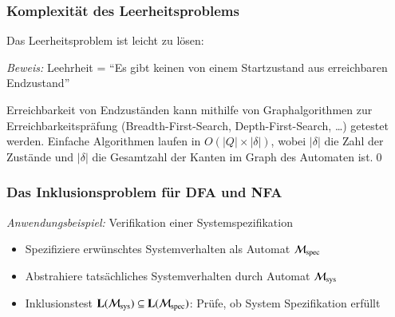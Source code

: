 \documentclass[onlymath]{beamer}
\begin{document}
\begin{frame}\frametitle{Komplexität des Leerheitsproblems}

Das Leerheitsproblem ist leicht zu lösen:


\pause
\emph{Beweis:} Leehrheit = "`Es gibt keinen von einem Startzustand aus erreichbaren Endzustand"'
\bigskip

Erreichbarkeit von Endzuständen kann mithilfe von Graphalgorithmen zur Erreichbarkeitspräfung (Breadth-First-Search, Depth-First-Search, \ldots) getestet werden. Einfache Algorithmen laufen in $O(|Q|\times |\delta|)$, wobei $|\delta|$ die Zahl der Zustände und $|\delta|$ die Gesamtzahl der Kanten im Graph des Automaten ist.\qed

\end{frame}

\begin{frame}\frametitle{Das Inklusionsproblem für DFA und NFA}


\emph{Anwendungsbeispiel:}
Verifikation einer Systemspezifikation
\begin{itemize}
\item Spezifiziere erwünschtes Systemverhalten als Automat $\mathcal{M}_{\text{spec}}$
\item Abstrahiere tatsächliches Systemverhalten durch Automat $\mathcal{M}_{\text{sys}}$
\item Inklusionstest $\textbf{\textcolor{black}{L}}(\mathcal{M}_{\text{sys}})\subseteq\textbf{\textcolor{black}{L}}(\mathcal{M}_{\text{spec}})$: Prüfe, ob System Spezifikation erfüllt
\end{itemize}

\end{frame}
\end{document}
